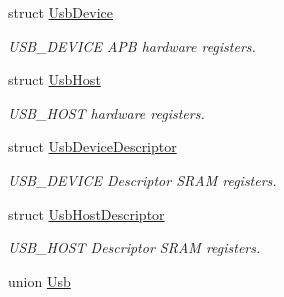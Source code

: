 \begin{DoxyCompactItemize}
struct \hyperlink{struct_usb_device}{Usb\+Device}
\begin{DoxyCompactList}\small\item\em U\+S\+B\+\_\+\+D\+E\+V\+I\+C\+E A\+P\+B hardware registers. \end{DoxyCompactList}\item 
struct \hyperlink{struct_usb_host}{Usb\+Host}
\begin{DoxyCompactList}\small\item\em U\+S\+B\+\_\+\+H\+O\+S\+T hardware registers. \end{DoxyCompactList}\item 
struct \hyperlink{struct_usb_device_descriptor}{Usb\+Device\+Descriptor}
\begin{DoxyCompactList}\small\item\em U\+S\+B\+\_\+\+D\+E\+V\+I\+C\+E Descriptor S\+R\+A\+M registers. \end{DoxyCompactList}\item 
struct \hyperlink{struct_usb_host_descriptor}{Usb\+Host\+Descriptor}
\begin{DoxyCompactList}\small\item\em U\+S\+B\+\_\+\+H\+O\+S\+T Descriptor S\+R\+A\+M registers. \end{DoxyCompactList}\item 
union \hyperlink{union_usb}{Usb}
\end{DoxyCompactItemize}
